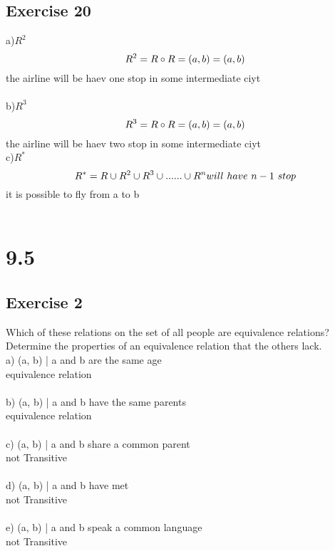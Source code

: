 \documentclass[12pt]{article}
\begin{document}
\subsection*{Exercise 20}
a)$R^2$\\
\begin{equation}\nonumber
    R^2=R\circ R\\
    ={(a,b)}\\
    ={(a,b)}\\
\end{equation}
the airline will be haev one stop in some intermediate ciyt\\
\\
b)$R^3$\\
\begin{equation}\nonumber
    R^3=R\circ R\\
    ={(a,b)}\\
    ={(a,b)}\\
\end{equation}
the airline will be haev two stop in some intermediate ciyt\\
c)$R^*$\\
\begin{equation}\nonumber
    R^*=R\cup R^2 \cup R^3 \cup ...... \cup R^n\\
    will~have~n-1~stop\\
\end{equation}
it is possible to fly from a to b\\
\\
\section*{9.5}
\subsection*{Exercise 2}
Which of these relations on the set of all people are equivalence relations? Determine the properties of an equivalence relation that the others lack.\\
a) {(a, b) | a and b are the same age}\\
equivalence relation\\
\\
b) {(a, b) | a and b have the same parents}\\
equivalence relation\\
\\
c) {(a, b) | a and b share a common parent} \\
not Transitive\\
\\
d) {(a, b) | a and b have met} \\
not Transitive\\
\\
e) {(a, b) | a and b speak a common language}\\
not Transitive\\
\\
\end{document}
